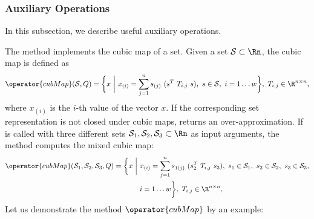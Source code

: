 \subsubsection{Auxiliary Operations}

In this subsection, we describe useful auxiliary operations.


The method  implements the cubic map of a set. Given a set $\mathcal{S} \subset \Rn$, the cubic map is defined as 
\begin{equation*}
	\operator{cubMap}(\mathcal{S},Q) = \bigg \{ x ~ \bigg | ~ x_{(i)} = \sum_{j=1}^n s_{(j)} ~(s^T ~T_{i,j}~ s), ~s \in \mathcal{S},~ i = 1 \dots w \bigg \}, ~ T_{i,j} \in \R^{n \times n},
\end{equation*}
where $x_{(i)}$ is the $i$-th value of the vector $x$. If the corresponding set representation is not closed under cubic maps,  returns an over-approximation. If  is called with three different sets $\mathcal{S}_1,\mathcal{S}_2,\mathcal{S}_3 \subset \Rn$ as input arguments, the method computes the mixed cubic map:
\begin{equation*}
\begin{split}
	\operator{cubMap}(\mathcal{S}_1,\mathcal{S}_2,\mathcal{S}_3,Q) = \bigg \{ x ~ \bigg | ~ & x_{(i)} = \sum_{j=1}^n s_{1(j)} ~(s_2^T ~T_{i,j}~ s_3), ~s_1 \in \mathcal{S}_1,~s_2 \in \mathcal{S}_2,~s_3 \in \mathcal{S}_3, \\
	& i = 1 \dots w \bigg \}, ~ T_{i,j} \in \R^{n \times n},
\end{split}
\end{equation*}
Let us demonstrate the method $\operator{cubMap}$ by an example:

\begin{center}
\begin{minipage}[t]{0.35\textwidth}
	\vspace{10pt}
	\footnotesize
	
\end{minipage}
\begin{minipage}[t]{0.6\textwidth}
	\vspace{0pt}
	\centering
\end{minipage}
\end{center}



